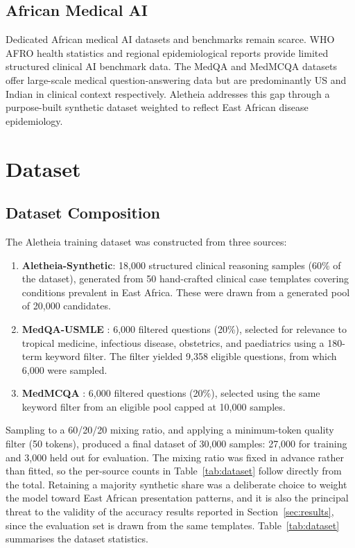 \documentclass[journal]{IEEEtran}
\begin{document}
\subsection{African Medical AI}

Dedicated African medical AI datasets and benchmarks remain scarce.
WHO AFRO health statistics \cite{afrihealth2023} and regional
epidemiological reports provide limited structured clinical AI benchmark data. The MedQA \cite{jin2021medqa} and
MedMCQA \cite{pmlr-v174-pal22a} datasets offer large-scale medical
question-answering data but are predominantly US and Indian in
clinical context respectively. Aletheia addresses this gap through
a purpose-built synthetic dataset weighted to reflect East African
disease epidemiology.

\section{Dataset}
\label{sec:dataset}

\subsection{Dataset Composition}

The Aletheia training dataset was constructed from three sources:

\begin{enumerate}
  \item \textbf{Aletheia-Synthetic}: 18{,}000 structured clinical
        reasoning samples (60\% of the dataset), generated from 50
        hand-crafted clinical case templates covering conditions
        prevalent in East Africa. These were drawn from a generated
        pool of 20{,}000 candidates.
  \item \textbf{MedQA-USMLE} \cite{jin2021medqa}: 6{,}000 filtered
        questions (20\%), selected for relevance to tropical medicine,
        infectious disease, obstetrics, and paediatrics using a
        180-term keyword filter. The filter yielded 9{,}358 eligible
        questions, from which 6{,}000 were sampled.
  \item \textbf{MedMCQA} \cite{pmlr-v174-pal22a}: 6{,}000 filtered
        questions (20\%), selected using the same keyword filter from
        an eligible pool capped at 10{,}000 samples.
\end{enumerate}

Sampling to a 60/20/20 mixing ratio, and applying a minimum-token
quality filter (50 tokens), produced a final dataset of 30{,}000
samples: 27{,}000 for training and 3{,}000 held out for evaluation.
The mixing ratio was fixed in advance rather than fitted, so the
per-source counts in Table~\ref{tab:dataset} follow directly from the
total. Retaining a majority synthetic share was a deliberate choice to
weight the model toward East African presentation patterns, and it is
also the principal threat to the validity of the accuracy results
reported in Section~\ref{sec:results}, since the evaluation set is
drawn from the same templates.
Table~\ref{tab:dataset} summarises the dataset statistics.
\end{document}
